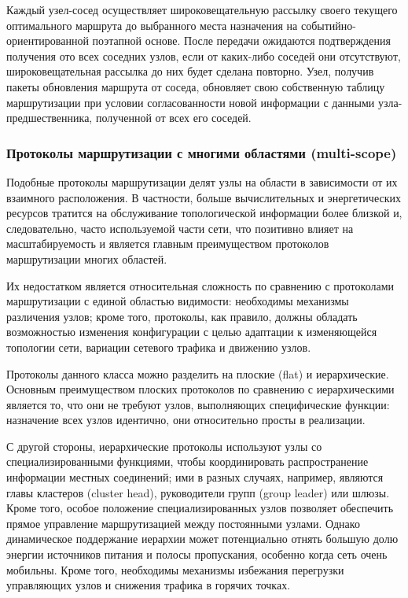\documentclass[14pt,a4paper,titlepage]{extarticle}
\begin{document}
Каждый узел-сосед осуществляет широковещательную рассылку своего текущего оптимального маршрута до выбранного места назначения на событийно-ориентированной поэтапной основе. После передачи ожидаются подтверждения получения ото всех соседних узлов, если от каких-либо соседей они отсутствуют, широковещательная рассылка до них будет сделана повторно. Узел, получив пакеты обновления маршрута от соседа, обновляет свою собственную таблицу маршрутизации при условии согласованности новой информации с данными узла-предшественника, полученной от всех его соседей.

\subsubsection{Протоколы маршрутизации с многими областями (multi-scope)}

Подобные протоколы маршрутизации делят узлы на области в зависимости от их взаимного расположения. В частности, больше вычислительных и энергетических ресурсов тратится на обслуживание топологической информации более близкой и, следовательно, часто используемой части сети, что позитивно влияет на масштабируемость и является главным преимуществом протоколов маршрутизации многих областей.

Их недостатком является относительная сложность по сравнению с протоколами маршрутизации с единой областью видимости: необходимы механизмы различения узлов; кроме того, протоколы, как правило, должны обладать возможностью изменения конфигурации с целью адаптации к изменяющейся топологии сети, вариации сетевого трафика и движению узлов. 

Протоколы данного класса можно разделить на плоские (flat) и иерархические. Основным преимуществом плоских протоколов по сравнению с иерархическими является то, что они не требуют узлов, выполняющих специфические функции: назначение всех узлов идентично, они относительно просты в реализации. 

С другой стороны, иерархические протоколы используют узлы со специализированными функциями, чтобы координировать распространение информации местных соединений; ими в разных случаях, например, являются главы кластеров (cluster head), руководители групп (group leader) или шлюзы. Кроме того, особое положение специализированных узлов позволяет обеспечить прямое управление маршрутизацией между постоянными узлами. Однако динамическое поддержание иерархии может потенциально отнять большую долю энергии источников питания и полосы пропускания, особенно когда сеть очень мобильны. Кроме того, необходимы механизмы избежания перегрузки управляющих узлов и снижения трафика в горячих точках.
\end{document}
